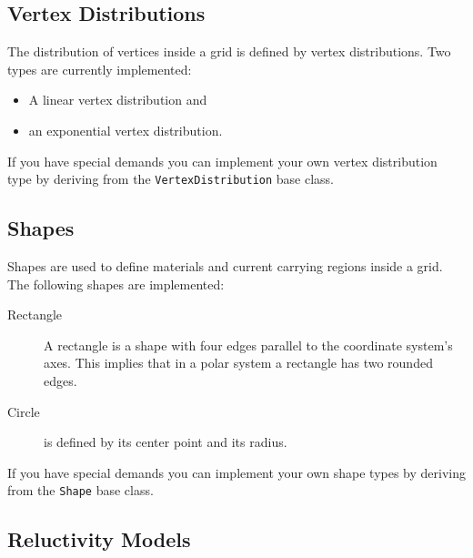 \subsection{Vertex Distributions}

The distribution of vertices inside a grid is defined by vertex
distributions.  Two types are currently implemented:
\begin{itemize}
\item A linear vertex distribution and
\item an exponential vertex distribution.
\end{itemize}
If you have special demands you can implement your own vertex
distribution type by deriving from the \texttt{VertexDistribution}
base class.


\subsection{Shapes}

Shapes are used to define materials and current carrying regions
inside a grid.  The following shapes are implemented:
\begin{description}
\item[Rectangle] A rectangle is a shape with four edges parallel to
  the coordinate system's axes.  This implies that in a polar system a
  rectangle has two rounded edges.
\item[Circle] is defined by its center point and its radius.
\end{description}
If you have special demands you can implement your own shape types by
deriving from the \texttt{Shape} base class.


\subsection{Reluctivity Models}
\label{sec:material-models}

